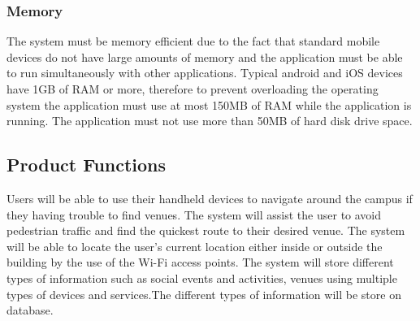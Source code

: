 \documentclass[english]{article}
\begin{document}
				\subsubsection{Memory}
					The system must be memory efficient due to the fact that standard mobile devices do not have large amounts of memory and the application must be able to run simultaneously with other applications.  
                    Typical android and iOS devices have 1GB of RAM or more, therefore to prevent overloading the operating system the application must use at most 150MB of RAM while the application is running.
                    The application must not use more than 50MB of hard disk drive space.

		\subsection{Product Functions}
            Users will be able to use their handheld devices to navigate around the campus if they having trouble to find venues. The system will assist the user to avoid pedestrian traffic and find the quickest route to their desired venue. The system will be able to locate the user’s current location either inside or outside the building by the use of the Wi-Fi access points. The system will store different types of information such as social events and activities, venues using multiple types of devices and services.The different types of information will be store on database. 
\end{document}
